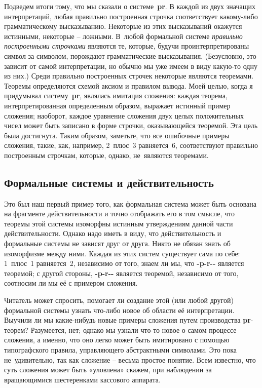 \documentclass[../main.tex]{subfiles}
\begin{document}
Подведем итоги тому, что мы сказали о системе~\textbf{pr}. В каждой из двух значащих интерпретаций, любая правильно построенная строчка соответствует какому-либо грамматическому высказыванию. Некоторые из этих высказываний окажутся истинными, некоторые \--- ложными. В~любой формальной системе \emph{правильно построенными строчками} являются те, которые, будучи проинтерпретированы символ за символом, порождают грамматические высказывания. (Безусловно, это зависит от самой интерпретации, но обычно мы уже имеем в виду какую-то одну из них.) Среди правильно построенных строчек некоторые являются теоремами. Теоремы определяются схемой аксиом и правилом вывода. Моей целью, когда я придумывал систему~\textbf{pr}, являлась имитация сложения: каждая теорема, интерпретированная определенным образом, выражает истинный пример сложения; наоборот, каждое уравнение сложения двух целых положительных чисел может быть записано в форме строчки, оказывающейся теоремой. Эта цель была достигнута. Таким образом, заметьте, что все ошибочные примеры сложения, такие, как, например, 2~плюс~3 равняется~6, соответствуют правильно построенным строчкам, которые, однако, не~являются теоремами.


\subsection{Формальные системы и действительность}

Это был наш первый пример того, как формальная система может быть основана на фрагменте действительности и точно отображать его в том смысле, что теоремы этой системы изоморфны истинным утверждениям данной части действительности. Однако надо иметь в виду, что действительность и формальные системы не зависят друг от друга. Никто не обязан знать об изоморфизме между ними. Каждая из этих систем существует сама по себе: 1~плюс~1 равняется~2, независимо от того, знаем ли мы, что \textbf{-p-r-{}-} является теоремой; с другой стороны, \textbf{-p-r-{}-} является теоремой, независимо от того, соотносим ли мы её с примером сложения.

Читатель может спросить, помогает ли создание этой (или любой другой) формальной системы узнать что-либо новое об области её интерпретации. Выучили ли мы какие-нибудь новые примеры сложения путем производства \textbf{pr}-теорем? Разумеется, нет; однако мы узнали что-то новое о самом процессе сложения, а именно, что оно легко может быть имитировано с помощью типографского правила, управляющего абстрактными символами. Это пока не~удивительно, так как сложение \--- весьма простое понятие. Всем известно, что суть сложения может быть «уловлена» скажем, при наблюдении за вращающимися шестеренками кассового аппарата.
\end{document}
